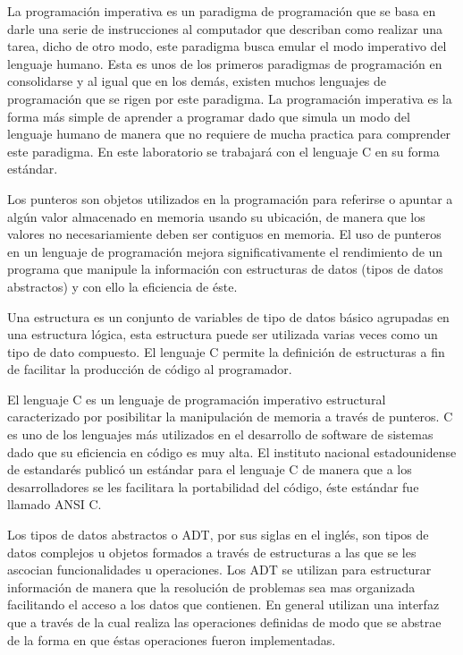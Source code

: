 \documentclass[letterpaper,12pt]{report}
\begin{document}
\begin{description}[align=left]

\item [Paradigma imperativo:] 
    La programación imperativa es un paradigma de programación que se basa en darle una serie de instrucciones 
    al computador que describan como realizar una tarea, dicho de otro modo, este paradigma busca emular el modo
    imperativo del lenguaje humano. Esta es unos de los primeros paradigmas de programación en consolidarse y al
    igual que en los demás, existen muchos lenguajes de programación que se rigen por este paradigma. La programación
    imperativa es la forma más simple de aprender a programar dado que simula un modo del lenguaje humano de manera que
    no requiere de mucha practica para comprender este paradigma. En este laboratorio se trabajará con el lenguaje C en
    su forma estándar.

\item [Punteros:]
    Los punteros son objetos utilizados en la programaci\'on para referirse o apuntar a algún valor almacenado
    en memoria usando su ubicación, de manera que los valores no necesariamiente deben ser contiguos en memoria.
    El uso de punteros en un lenguaje de programación mejora significativamente el rendimiento de un programa que 
    manipule la información con estructuras de datos (tipos de datos abstractos) y con ello la eficiencia de éste.

\item [Estructura:]
    Una estructura es un conjunto de variables de tipo de datos básico agrupadas en una estructura lógica, esta estructura puede ser utilizada varias veces como un tipo de dato compuesto. El lenguaje C permite la definición de estructuras a fin de facilitar la producción de código al programador.

\item [Lenguaje de programaci\'on ANSI C:]
    El lenguaje C es un lenguaje de programación imperativo estructural caracterizado por
    posibilitar la manipulación de memoria a través de punteros. C es uno de los lenguajes más
    utilizados en el desarrollo de software de sistemas dado que su eficiencia en código es 
    muy alta. El instituto nacional estadounidense de estandarés publicó un estándar para el 
    lenguaje C de manera que a los desarrolladores se les facilitara la portabilidad del código,
    éste estándar fue llamado ANSI C.

\item [Tipos de datos abstractos:]
    Los tipos de datos abstractos o ADT, por sus siglas en el inglés, son tipos de datos complejos u objetos formados a través de estructuras a las que se les ascocian funcionalidades u operaciones. Los ADT se utilizan para estructurar información de manera que la resolución de problemas sea mas organizada facilitando el acceso a los datos que contienen. En general utilizan una interfaz que a través de la cual realiza las operaciones definidas de modo que se abstrae de la forma en que éstas operaciones fueron implementadas. 

\end{description}
\end{document}

